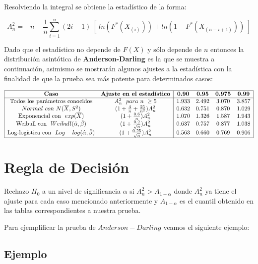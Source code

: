 \documentclass[
  a4paper,
  oneside,
  openany]{book}
\begin{document}
Resolviendo la integral se obtiene la estadístico de la forma:

\[A_n^2=-n-\frac{1}{n}\sum_{i=1}^{n}\left(2i-1\right) \ [ \ ln(F^*(X_{(i)})) +ln(1-F^*(X_{(n-i+1)})) \ ]\]

Dado que el estadístico no depende de \(F(X)\) y sólo depende de \(n\) entonces la distribución
asintótica de \textbf{Anderson-Darling} es la que se muestra a continuación, asimismo se mostrarán algunos
ajustes a la estadística con la finalidad de que la prueba sea más potente para determinados
casos:

\[
\begin{array}{|c c| c c c c|}
\hline
\textbf{Caso} & \textbf{Ajuste en el estadístico} &\textbf{0.90} &\textbf{0.95} & \textbf{0.975} & \textbf{0.99} \\
\hline
\mbox{Todos los parámetros conocidos} & A_{n}^{2} \ \ para\ n\ \geq 5 & 1.933 & 2.492 & 3.070 & 3.857 \\
Normal\ con\ N(\overline{X},S^2) & (1+\frac{4}{n}+\frac{25}{n^2})A_{n}^{2} & 0.632 & 0.751 & 0.870 & 1.029 \\
\mbox{Exponencial con} \ \ exp(\overline{X}) & (1+\frac{0.6}{n})A_{n}^{2} & 1.070 & 1.326 & 1.587 & 1.943 \\
\mbox{Weibull con} \ \ Weibull(\hat{\alpha},\hat{\beta}) & (1+\frac{0.2}{\sqrt{n}})A_{n}^{2} & 0.637 & 0.757 & 0.877 & 1.038 \\
\mbox{Log-logística con} \ \ Log-log(\hat{\alpha},\hat{\beta}) & (1+\frac{0.25}{\sqrt{n}})A_{n}^{2} & 0.563 & 0.660 & 0.769 & 0.906 \\
\hline
\end{array}
\]

\hypertarget{regla-de-decisiuxf3n-34}{%
\section{Regla de Decisión}\label{regla-de-decisiuxf3n-34}}

Rechazo \(H_0\) a un nivel de significancia \(\alpha\) si \(A_{n}^2> A_{1-\alpha}\) donde \(A_{n}^{2}\) ya tiene el ajuste para cada caso mencionado anteriormente y \(A_{1-\alpha}\) es el cuantil obtenido en las tablas correspondientes a nuestra prueba.

Para ejemplificar la prueba de \(Anderson-Darling\) veamos el siguiente ejemplo:

\hypertarget{ejemplo-17}{%
\subsection{Ejemplo}\label{ejemplo-17}}
\end{document}
